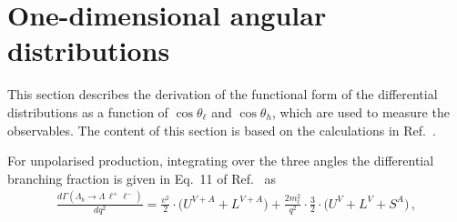 \section{One-dimensional angular distributions}

This section describes the derivation of the functional form of the differential distributions 
as a function of $\cos\theta_\ell$ and $\cos\theta_h$, which are used to measure
the observables. The content of this section is based on the calculations in Ref.~\cite{Gutsche:2013pp}. 

For unpolarised \Lb production,
%
%
integrating over the three angles the differential branching fraction is given in Eq.~11 of Ref.~\cite{Gutsche:2013pp} as
\begin{eqnarray}
\label{bjoint00}
\frac{d\Gamma(\Lambda_b \to \Lambda \,\ell^{+}\ell^{-})}{d q^2}=
\frac{v^{2}}{2}\cdot\bigg( U^{V+A} + L^{V+A} \bigg)
+\frac{2m_\ell^{2}}{q^{2}}\cdot\frac{3}{2}\cdot
\bigg( U^{V} + L^{V} + S^{A} \bigg)\,, 
\end{eqnarray}
